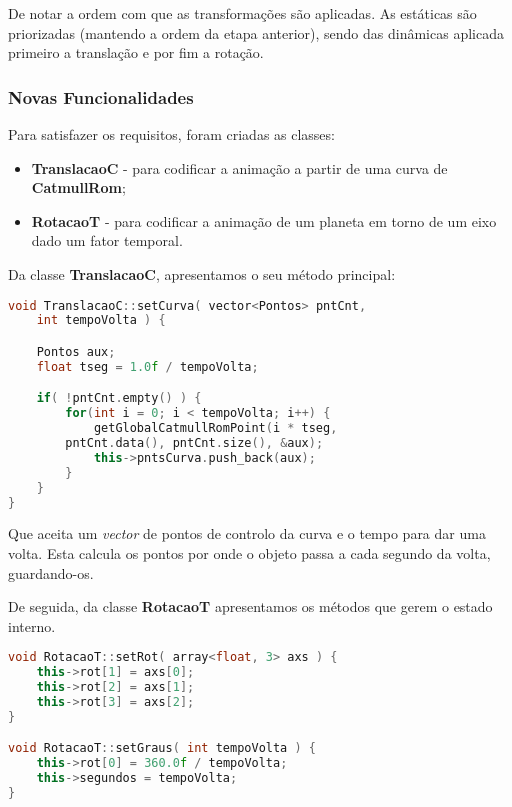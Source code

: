 \documentclass{article}
\begin{document}
\begin{info}
	De notar a ordem com que as transformações são aplicadas. As estáticas são priorizadas (mantendo a ordem da etapa anterior), sendo das dinâmicas aplicada primeiro a translação e por fim a rotação.
\end{info}

\subsubsection{Novas Funcionalidades}
Para satisfazer os requisitos, foram criadas as classes:
\begin{itemize}
	\item \textbf{TranslacaoC} - para codificar a animação a partir de uma curva de \textbf{CatmullRom};
	\item \textbf{RotacaoT} - para codificar a animação de um planeta em torno de um eixo dado um fator temporal.
\end{itemize}


Da classe \textbf{TranslacaoC}, apresentamos o seu método principal:

\begin{file}
        \begin{lstlisting}[language=C++]
void TranslacaoC::setCurva( vector<Pontos> pntCnt, 
	int tempoVolta ) {

    Pontos aux;
    float tseg = 1.0f / tempoVolta;

    if( !pntCnt.empty() ) {
        for(int i = 0; i < tempoVolta; i++) {
            getGlobalCatmullRomPoint(i * tseg, 
	    pntCnt.data(), pntCnt.size(), &aux);
            this->pntsCurva.push_back(aux);
        }
    }
}
	\end{lstlisting}
\end{file}

Que aceita um \textit{vector} de pontos de controlo da curva e o tempo para dar uma volta. Esta calcula os pontos por onde o objeto passa a cada segundo da volta, guardando-os.

De seguida, da classe \textbf{RotacaoT} apresentamos os métodos que gerem o estado interno.

\begin{file}
        \begin{lstlisting}[language=C++]
void RotacaoT::setRot( array<float, 3> axs ) {
    this->rot[1] = axs[0];
    this->rot[2] = axs[1];
    this->rot[3] = axs[2];
}

void RotacaoT::setGraus( int tempoVolta ) {
    this->rot[0] = 360.0f / tempoVolta;
    this->segundos = tempoVolta;
}
	\end{lstlisting}
\end{file}
\end{document}

